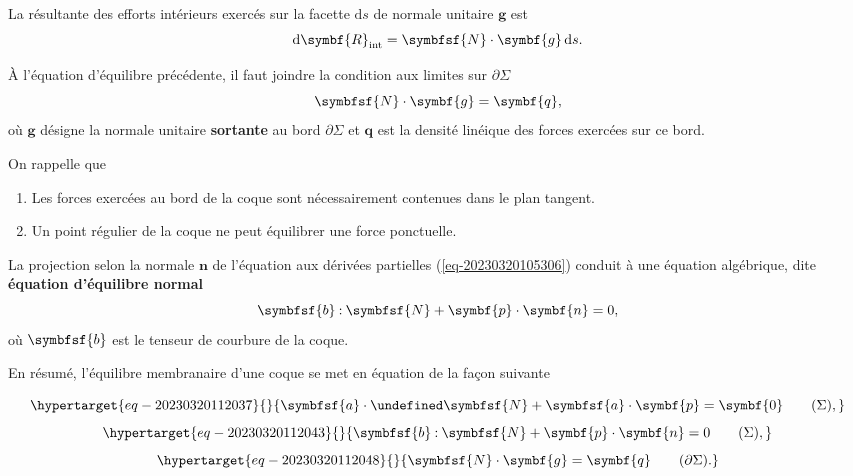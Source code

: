\documentclass[
  a4paper,
  DIV=11,
  numbers=noendperiod]{scrreprt}
\providecommand{\tightlist}{%
  \setlength{\itemsep}{0pt}\setlength{\parskip}{0pt}}\usepackage{longtable,booktabs,array}
\newcommand{\D}{{\mathrm d}}
\newcommand{\dbldot}{\mathbin{\mathord{:}}}
\let\div\undefined
\newcommand{\div}{\operatorname{div}}
\newcommand{\internal}{\mathrm{int}}
\newcommand{\tens}[1]{\symbfsf{#1}}
\renewcommand{\vec}[1]{\symbf{#1}}
\begin{document}
\begin{tcolorbox}[enhanced jigsaw, toprule=.15mm, breakable, left=2mm, rightrule=.15mm, colbacktitle=quarto-callout-warning-color!10!white, colframe=quarto-callout-warning-color-frame, title=\textcolor{quarto-callout-warning-color}{\faExclamationTriangle}\hspace{0.5em}{Interprétation physique des contraintes membranaires}, bottomtitle=1mm, arc=.35mm, coltitle=black, opacityback=0, leftrule=.75mm, titlerule=0mm, toptitle=1mm, bottomrule=.15mm, opacitybacktitle=0.6, colback=white]

La résultante des efforts intérieurs exercés sur la facette \(\D s\) de
normale unitaire \(\vec{g}\) est \[
\D \vec{R}_\internal = \tens{N} \cdot \vec{g} \, \D s.
\]

\end{tcolorbox}

À l'équation d'équilibre précédente, il faut joindre la condition aux
limites sur \(\partial \Sigma\) \[
\tens{N} \cdot \vec{g} = \vec{q},
\] où \(\vec{g}\) désigne la normale unitaire \textbf{sortante} au bord
\(\partial \Sigma\) et \(\vec{q}\) est la densité linéique des forces
exercées sur ce bord.

On rappelle que

\begin{enumerate}
\def\labelenumi{\arabic{enumi}.}
\tightlist
\item
  Les forces exercées au bord de la coque sont nécessairement contenues
  dans le plan tangent.
\item
  Un point régulier de la coque ne peut équilibrer une force ponctuelle.
\end{enumerate}

La projection selon la normale \(\vec{n}\) de l'équation aux dérivées
partielles (\ref{eq-20230320105306}) conduit à une équation algébrique,
dite \textbf{équation d'équilibre normal} \[
\tens{b} \dbldot \tens{N} + \vec{p} \cdot \vec{n} = 0,
\] où \(\tens{b}\) est le tenseur de courbure de la coque.

En résumé, l'équilibre membranaire d'une coque se met en équation de la
façon suivante

\begin{equation}\protect\hypertarget{eq-20230320112037}{}{
\tens{a} \cdot \div \tens{N} + \tens{a} \cdot \vec{p} = \vec{0} \qquad (\Sigma),
}\label{eq-20230320112037}\end{equation}
\begin{equation}\protect\hypertarget{eq-20230320112043}{}{
\tens{b} \dbldot \tens{N} + \vec{p} \cdot \vec{n} = 0 \qquad (\Sigma),
}\label{eq-20230320112043}\end{equation}
\begin{equation}\protect\hypertarget{eq-20230320112048}{}{
\tens{N} \cdot \vec{g} = \vec{q} \qquad (\partial \Sigma).
}\label{eq-20230320112048}\end{equation}
\end{document}

